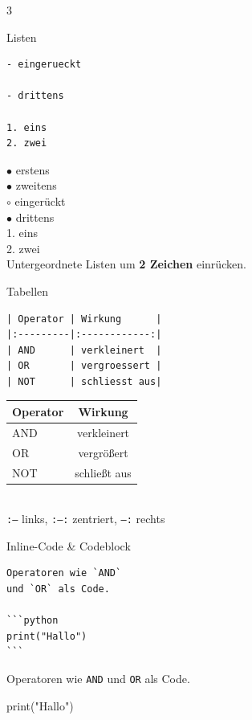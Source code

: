 \documentclass[a4paper,landscape,9pt]{extarticle}
\newcommand{\prevtxt}[1]{{\small #1}}
\begin{document}
\begin{multicols}{3}
\begin{mdcard}{Listen}
\begin{lstlisting}[language=lia]
  - eingerueckt

- drittens

1. eins
2. zwei
\end{lstlisting}
\tcblower
\prevtxt{%
$\bullet$ erstens\\
$\bullet$ zweitens\\[2pt]
\hspace*{1em}$\circ$ eingerückt\\[2pt]
$\bullet$ drittens\\[3pt]
1. eins\\
2. zwei\\[2pt]
{\scriptsize\color{muted}Untergeordnete Listen um \textbf{2 Zeichen} einrücken.}}
\end{mdcard}


\begin{mdcard}{Tabellen}
\begin{lstlisting}[language=lia]
| Operator | Wirkung      |
|:---------|:------------:|
| AND      | verkleinert  |
| OR       | vergroessert |
| NOT      | schliesst aus|
\end{lstlisting}
\tcblower
\prevtxt{%
\renewcommand{\arraystretch}{1.05}%
\begin{tabular}{|l|c|}\hline
\textbf{Operator} & \textbf{Wirkung}\\\hline
AND & verkleinert\\
OR  & vergrößert\\
NOT & schließt aus\\\hline
\end{tabular}\\[2pt]
{\scriptsize\color{muted}\texttt{:--} links, \texttt{:--:} zentriert, \texttt{--:} rechts}}
\end{mdcard}

\begin{mdcard}{Inline-Code \& Codeblock}
\begin{lstlisting}[language=lia]
Operatoren wie `AND`
und `OR` als Code.

```python
print("Hallo")
```
\end{lstlisting}
\tcblower
\prevtxt{Operatoren wie \texttt{\small AND}
und \texttt{\small OR} als Code.\\[3pt]
\colorbox{codebg}{\parbox{0.85\linewidth}{\ttfamily\scriptsize print("Hallo")}}}
\end{mdcard}


\end{multicols}
\end{document}
